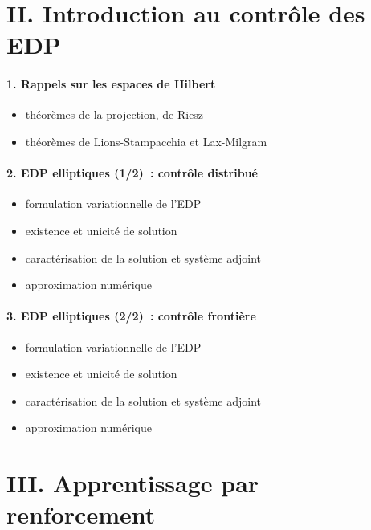 \documentclass[11pt,a4paper]{article}
\theoremstyle{plain}
\theoremstyle{definition}
\begin{document}
\section*{II. Introduction au contr\^ole des EDP} 

\paragraph{1. Rappels sur les espaces de Hilbert} 

\begin{itemize}
  \item th\'eor\`emes de la projection, de Riesz
  \item th\'eor\`emes de Lions-Stampacchia et Lax-Milgram
\end{itemize}

\paragraph{2. EDP elliptiques (1/2)~: contr\^ole distribu\'e} 

\begin{itemize}
  \item formulation variationnelle de l'EDP
  \item existence et unicit\'e de solution
  \item caract\'erisation de la solution et syst\`eme adjoint
  \item approximation num\'erique
\end{itemize}

\paragraph{3. EDP elliptiques (2/2)~: contr\^ole fronti\`ere} 

\begin{itemize}
  \item formulation variationnelle de l'EDP
  \item existence et unicit\'e de solution
  \item caract\'erisation de la solution et syst\`eme adjoint
  \item approximation num\'erique
\end{itemize}

\section*{III. Apprentissage par renforcement}
\end{document}
